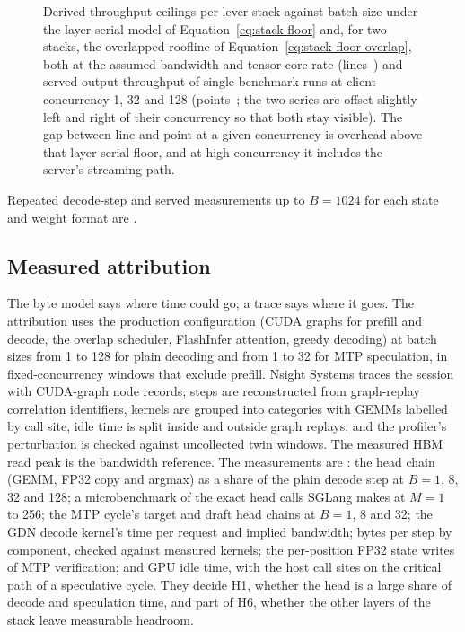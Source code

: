\begin{figure}[tbp]
\caption{Derived throughput ceilings per lever stack against batch size under the layer-serial model of Equation~\eqref{eq:stack-floor} and, for two stacks, the overlapped roofline of Equation~\eqref{eq:stack-floor-overlap}, both at the assumed bandwidth and tensor-core rate (lines~) and served output throughput of single benchmark runs at client concurrency 1, 32 and 128 (points~; the two series are offset slightly left and right of their concurrency so that both stay visible). The gap between line and point at a given concurrency is overhead above that layer-serial floor, and at high concurrency it includes the server's streaming path.}
\label{fig:stack-ceilings}
\end{figure}

Repeated decode-step and served measurements up to $B=1024$ for each state and weight format are .

\subsection{Measured attribution}\label{sec:time-measured}\label{sec:time-method}\label{sec:time-head}\label{sec:time-state}
The byte model says where time could go; a trace says where it goes. The attribution uses the production configuration (CUDA graphs for prefill and decode, the overlap scheduler, FlashInfer attention, greedy decoding) at batch sizes from 1 to 128 for plain decoding and from 1 to 32 for MTP speculation, in fixed-concurrency windows that exclude prefill. Nsight Systems traces the session with CUDA-graph node records; steps are reconstructed from graph-replay correlation identifiers, kernels are grouped into categories with GEMMs labelled by call site, idle time is split inside and outside graph replays, and the profiler's perturbation is checked against uncollected twin windows. The measured HBM read peak is the bandwidth reference. The measurements are : the head chain (GEMM, FP32 copy and argmax) as a share of the plain decode step at $B=1$, 8, 32 and 128; a microbenchmark of the exact head calls SGLang makes at $M=1$ to 256; the MTP cycle's target and draft head chains at $B=1$, 8 and 32; the GDN decode kernel's time per request and implied bandwidth; bytes per step by component, checked against measured kernels; the per-position FP32 state writes of MTP verification; and GPU idle time, with the host call sites on the critical path of a speculative cycle. They decide H1, whether the head is a large share of decode and speculation time, and part of H6, whether the other layers of the stack leave measurable headroom.

